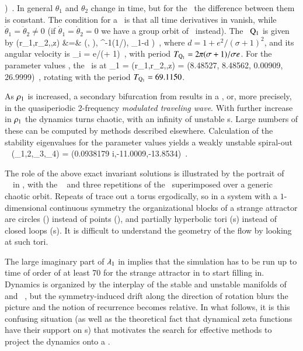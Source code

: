 \documentclass[preprint,number,sort&compress]{elsarticle}
\begin{document}
\right)
\,.
\label{eq:PolarCLeAngles}
\eeq
In general $\theta_1$ and
$\theta_2$ change in time, but for the \reqva\ the
difference between them is constant.
The condition for a \reqv\ is that all
time derivatives in  vanish, while
$\dot{\theta}_1=\dot{\theta}_2\neq 0$ (if
$\dot{\theta}_1=\dot{\theta}_2=0$ we have a group orbit
of \eqva\ instead).
The \reqv\
$\mathrm{Q}_{1}$ is given by
\bea
(r_1,r_2,\theta,z) &=&
\left(,  ),
     \cos^{-1}({1}/{}),  \rho_1-d
\right)
\,,
\label{eq:E1-PC}
\eea
where $d=1 + {e^2}/{(\sigma +1)^2}$, and
its angular velocity is
\beq
\dot{\theta}_{i}
= {\sigma e}/{(\sigma + 1)}
\,,
\label{eq:REQV1veloc}
\eeq
with period
${T_{{\mathrm{Q}_{1}}}}= 2\pi (\sigma + 1)/\sigma e$.
For the parameter values , the \reqv\ is at
\beq
\ssp_{\REQV{}1} = (r_1,r_2,\theta,z) =
     (8.48527,
      8.48562,
      0.00909,
      26.9999)
\,,
\label{eq:Q1}
\eeq
rotating with the period ${T_{{\mathrm{Q}_{1}}}}=69.1150$.

As $\rho_1$ is increased,  a secondary bifurcation from
 results in a \emph{\rpo} , or,
more precisely, in the quasiperiodic 2-frequency
\emph{modulated traveling wave}.
With further increase in $\rho_1$ the dynamics turns
chaotic, with {an} infinity of unstable {\rpo s}. Large numbers of
these can be computed by methods described
elsewhere.
Calculation of {the}  stability eigenvalues for the
parameter values 
yields a weakly unstable spiral-out
\eqv\
\beq
(\eigExp_{1,2},\eigExp_3,\eigExp_4)
= (0.0938179  i,-11.0009,-13.8534)
\,.


The role of {the} above exact invariant solutions is illustrated by the
portrait of \cLf\ \statesp\ in  , with the
\reqv\ \REQV{}{1} and three repetitions of {the} \cycle{01} \rpo\
superimposed over a generic chaotic orbit. Repeats of
\cycle{01} {trace out a torus ergodically}, so in a system with
a $1$-dimensional continuous symmetry the organizational
blocks of a strange attractor are circles (\reqva) instead of
points (\eqva), and partially hyperbolic tori (\rpo s)
instead of closed loops (\po s). It is difficult to
understand the geometry of the flow by looking at such tori.

The large imaginary part of $\eigExp_{1}$ in
\refeq{eq:CLeREQBstab} implies that the simulation has to be
run up to time of order of at least 70 for the strange
attractor in \reffig{fig:CLE} to start filling in. Dynamics
is organized by the interplay of the stable and unstable
manifolds of \eqv\ \EQV{0} and \reqv\ \REQV{}{1}, but the
symmetry-induced drift along the direction of rotation blurs
the picture and the notion of recurrence becomes relative. In
what follows, it is this confusing situation (as well as the
theoretical fact\rf{Cvi07} that dynamical zeta functions have
their support on \rpo s) that motivates the search for
effective methods to project the dynamics onto a \reducedsp.
\end{document}
